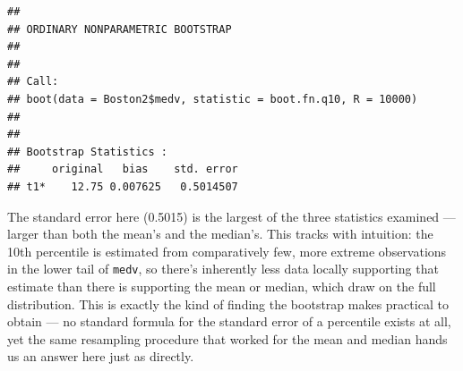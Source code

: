 \documentclass[
  11pt,
]{article}
\begin{document}
\begin{verbatim}
## 
## ORDINARY NONPARAMETRIC BOOTSTRAP
## 
## 
## Call:
## boot(data = Boston2$medv, statistic = boot.fn.q10, R = 10000)
## 
## 
## Bootstrap Statistics :
##     original   bias    std. error
## t1*    12.75 0.007625   0.5014507
\end{verbatim}

The standard error here (0.5015) is the largest of the three statistics
examined --- larger than both the mean's and the median's. This tracks
with intuition: the 10th percentile is estimated from comparatively few,
more extreme observations in the lower tail of \texttt{medv}, so there's
inherently less data locally supporting that estimate than there is
supporting the mean or median, which draw on the full distribution. This
is exactly the kind of finding the bootstrap makes practical to obtain
--- no standard formula for the standard error of a percentile exists at
all, yet the same resampling procedure that worked for the mean and
median hands us an answer here just as directly.
\end{document}
